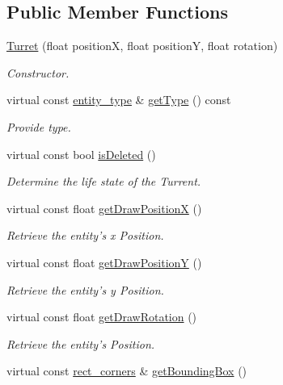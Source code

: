 \subsection*{Public Member Functions}
\begin{DoxyCompactItemize}
\item 
\hyperlink{classTurret_ad4865ea38c314056d61968609773ec46}{Turret} (float position\-X, float position\-Y, float rotation)
\begin{DoxyCompactList}\small\item\em Constructor. \end{DoxyCompactList}\item 
virtual const \hyperlink{Structures_8h_a6d8f83e710b27d4f86c45f0bb77066e3}{entity\-\_\-type} \& \hyperlink{classTurret_a4998bf256706dc75926e683f08862b80}{get\-Type} () const 
\begin{DoxyCompactList}\small\item\em Provide type. \end{DoxyCompactList}\item 
virtual const bool \hyperlink{classTurret_a204a0c45ddcc9139cda14dcd1493fd86}{is\-Deleted} ()
\begin{DoxyCompactList}\small\item\em Determine the life state of the Turrent. \end{DoxyCompactList}\item 
virtual const float \hyperlink{classTurret_aecf0bc7d827c8f05f48b730daf00d9e4}{get\-Draw\-Position\-X} ()
\begin{DoxyCompactList}\small\item\em Retrieve the entity's x Position. \end{DoxyCompactList}\item 
virtual const float \hyperlink{classTurret_ab86c156ea9ba76d33458601aa0eb454b}{get\-Draw\-Position\-Y} ()
\begin{DoxyCompactList}\small\item\em Retrieve the entity's y Position. \end{DoxyCompactList}\item 
virtual const float \hyperlink{classTurret_a52a79fd86533f6b3d94223a60df41aaa}{get\-Draw\-Rotation} ()
\begin{DoxyCompactList}\small\item\em Retrieve the entity's Position. \end{DoxyCompactList}\item 
virtual const \hyperlink{structrect__corners}{rect\-\_\-corners} \& \hyperlink{classTurret_a48007e1c8b99645e13b24e24b850fbaa}{get\-Bounding\-Box} ()

\end{DoxyCompactItemize}
